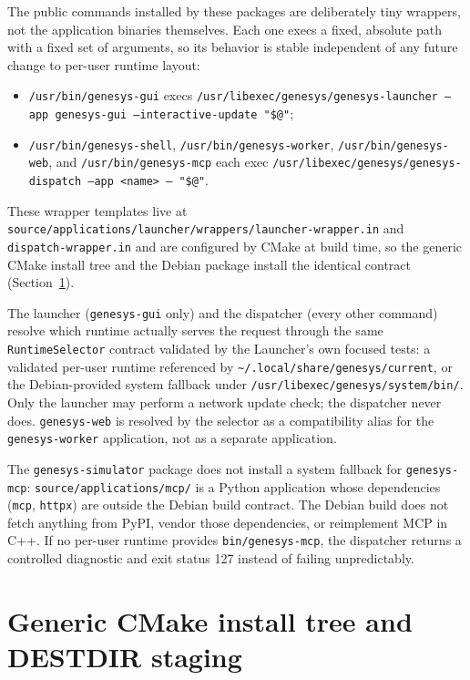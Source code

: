 The public commands installed by these packages are deliberately tiny
wrappers, not the application binaries themselves. Each one execs a fixed,
absolute path with a fixed set of arguments, so its behavior is stable
independent of any future change to per-user runtime layout:
\begin{itemize}
\item \texttt{/usr/bin/genesys-gui} execs
  \texttt{/usr/libexec/genesys/genesys-launcher --app genesys-gui\allowbreak{} --interactive-update "\$@"};
\item \texttt{/usr/bin/genesys-shell}, \texttt{/usr/bin/genesys-worker},
  \texttt{/usr/bin/genesys-web}, and \texttt{/usr/bin/genesys-mcp} each exec
  \texttt{/usr/libexec/genesys/genesys-dispatch --app <name> -- "\$@"}.
\end{itemize}
These wrapper templates live at
\texttt{source/applications/launcher/wrappers/launcher-wrapper.in} and
\texttt{dispatch-wrapper.in} and are configured by CMake at build time, so the
generic CMake install tree and the Debian package install the identical
contract (Section~\ref{sec:packaging-cmake-install-tree}).

The launcher (\texttt{genesys-gui} only) and the dispatcher (every other
command) resolve which runtime actually serves the request through the same
\texttt{RuntimeSelector} contract validated by the Launcher's own focused
tests: a validated per-user runtime referenced by
\texttt{\textasciitilde/.local/share/genesys/current}, or the Debian-provided
system fallback under \texttt{/usr/libexec/genesys/system/bin/}. Only the
launcher may perform a network update check; the dispatcher never does.
\texttt{genesys-web} is resolved by the selector as a compatibility alias for
the \texttt{genesys-worker} application, not as a separate application.

The \texttt{genesys-simulator} package does not install a system fallback for
\texttt{genesys-mcp}: \texttt{source/applications/mcp/} is a Python
application whose dependencies (\texttt{mcp}, \texttt{httpx}) are outside the
Debian build contract. The Debian build does not fetch anything from PyPI,
vendor those dependencies, or reimplement MCP in C++. If no per-user runtime
provides \texttt{bin/genesys-mcp}, the dispatcher returns a controlled
diagnostic and exit status 127 instead of failing unpredictably.

\section{Generic CMake install tree and DESTDIR staging}
\label{sec:packaging-cmake-install-tree}


